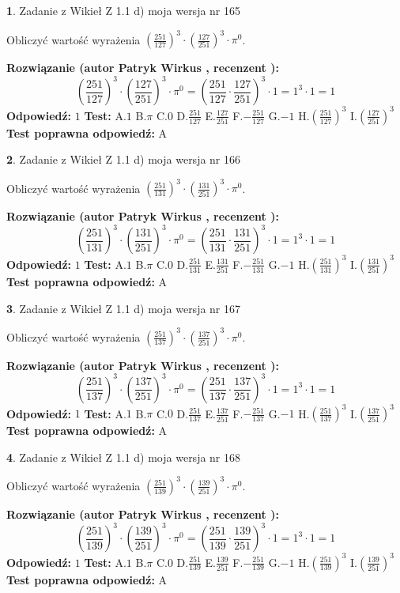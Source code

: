 \documentclass[12pt, a4paper]{article}
\theoremstyle{definition} %
\newtheorem{zad}{}
\newcommand{\zadStart}[1]{\begin{zad}#1\newline}
\newcommand{\zadStop}{\end{zad}}
\newcommand{\rozwStart}[2]{\noindent \textbf{Rozwiązanie (autor #1 , recenzent #2): }\newline}
\newcommand{\rozwStop}{\newline}
\newcommand{\odpStart}{\noindent \textbf{Odpowiedź:}\newline}
\newcommand{\odpStop}{\newline}
\newcommand{\testStart}{\noindent \textbf{Test:}\newline}
\newcommand{\testStop}{\newline}
\newcommand{\kluczStart}{\noindent \textbf{Test poprawna odpowiedź:}\newline}
\newcommand{\kluczStop}{\newline}
\begin{document}
\zadStart{Zadanie z Wikieł Z 1.1 d) moja wersja nr 165}

Obliczyć wartość wyrażenia $(\frac{251}{127})^{3} \cdot (\frac{127}{251})^{3} \cdot \pi^{0}$.
\zadStop
\rozwStart{Patryk Wirkus}{}
$$(\frac{251}{127})^{3} \cdot (\frac{127}{251})^{3} \cdot \pi^{0} = (\frac{251}{127} \cdot \frac{127}{251})^{3} \cdot 1 = 1^{3} \cdot 1 = 1$$
\rozwStop
\odpStart
$1$
\odpStop
\testStart
A.$1$ B.$\pi$ C.$0$ D.$\frac{251}{127}$ E.$\frac{127}{251}$
F.$-\frac{251}{127}$ G.$-1$
H.$(\frac{251}{127})^{3}$
I.$(\frac{127}{251})^{3}$
\testStop
\kluczStart
A
\kluczStop



\zadStart{Zadanie z Wikieł Z 1.1 d) moja wersja nr 166}

Obliczyć wartość wyrażenia $(\frac{251}{131})^{3} \cdot (\frac{131}{251})^{3} \cdot \pi^{0}$.
\zadStop
\rozwStart{Patryk Wirkus}{}
$$(\frac{251}{131})^{3} \cdot (\frac{131}{251})^{3} \cdot \pi^{0} = (\frac{251}{131} \cdot \frac{131}{251})^{3} \cdot 1 = 1^{3} \cdot 1 = 1$$
\rozwStop
\odpStart
$1$
\odpStop
\testStart
A.$1$ B.$\pi$ C.$0$ D.$\frac{251}{131}$ E.$\frac{131}{251}$
F.$-\frac{251}{131}$ G.$-1$
H.$(\frac{251}{131})^{3}$
I.$(\frac{131}{251})^{3}$
\testStop
\kluczStart
A
\kluczStop



\zadStart{Zadanie z Wikieł Z 1.1 d) moja wersja nr 167}

Obliczyć wartość wyrażenia $(\frac{251}{137})^{3} \cdot (\frac{137}{251})^{3} \cdot \pi^{0}$.
\zadStop
\rozwStart{Patryk Wirkus}{}
$$(\frac{251}{137})^{3} \cdot (\frac{137}{251})^{3} \cdot \pi^{0} = (\frac{251}{137} \cdot \frac{137}{251})^{3} \cdot 1 = 1^{3} \cdot 1 = 1$$
\rozwStop
\odpStart
$1$
\odpStop
\testStart
A.$1$ B.$\pi$ C.$0$ D.$\frac{251}{137}$ E.$\frac{137}{251}$
F.$-\frac{251}{137}$ G.$-1$
H.$(\frac{251}{137})^{3}$
I.$(\frac{137}{251})^{3}$
\testStop
\kluczStart
A
\kluczStop



\zadStart{Zadanie z Wikieł Z 1.1 d) moja wersja nr 168}

Obliczyć wartość wyrażenia $(\frac{251}{139})^{3} \cdot (\frac{139}{251})^{3} \cdot \pi^{0}$.
\zadStop
\rozwStart{Patryk Wirkus}{}
$$(\frac{251}{139})^{3} \cdot (\frac{139}{251})^{3} \cdot \pi^{0} = (\frac{251}{139} \cdot \frac{139}{251})^{3} \cdot 1 = 1^{3} \cdot 1 = 1$$
\rozwStop
\odpStart
$1$
\odpStop
\testStart
A.$1$ B.$\pi$ C.$0$ D.$\frac{251}{139}$ E.$\frac{139}{251}$
F.$-\frac{251}{139}$ G.$-1$
H.$(\frac{251}{139})^{3}$
I.$(\frac{139}{251})^{3}$
\testStop
\kluczStart
A
\kluczStop
\end{document}
